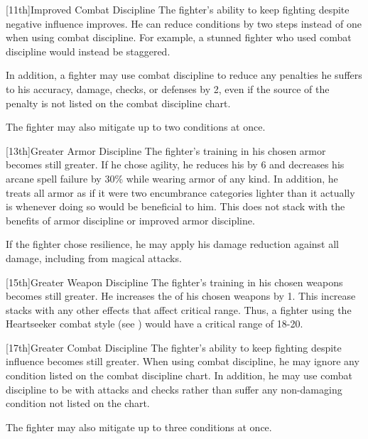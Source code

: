         [11th]{Improved Combat Discipline}
        The fighter's ability to keep fighting despite negative influence improves.
        He can reduce conditions by two steps instead of one when using combat discipline.
        For example, a stunned fighter who used combat discipline would instead be staggered.
        \par In addition, a fighter may use combat discipline to reduce any penalties he suffers to his accuracy, damage, checks, or defenses by 2, even if the source of the penalty is not listed on the combat discipline chart.
        \par The fighter may also mitigate up to two conditions at once.

        [13th]{Greater Armor Discipline}
        The fighter's training in his chosen armor becomes still greater.
        If he chose agility, he reduces his  by 6 and decreases his arcane spell failure by 30\% while wearing armor of any kind.
        In addition, he treats all armor as if it were two encumbrance categories lighter than it actually is whenever doing so would be beneficial to him.
        This does not stack with the benefits of armor discipline or improved armor discipline.

        If the fighter chose resilience, he may apply his damage reduction against all damage, including from magical attacks.

        [15th]{Greater Weapon Discipline}
        The fighter's training in his chosen weapons becomes still greater.
        He increases the  of his chosen weapons by 1.
        This increase stacks with any other effects that affect critical range.
        Thus, a fighter using the Heartseeker combat style (see ) would have a critical range of 18-20.

        [17th]{Greater Combat Discipline}
        The fighter's ability to keep fighting despite influence becomes still greater.
        When using combat discipline, he may ignore any condition listed on the combat discipline chart.
        In addition, he may use combat discipline to be \severelyimpaired with attacks and checks rather than suffer any non-damaging condition not listed on the chart.

        \par The fighter may also mitigate up to three conditions at once.

